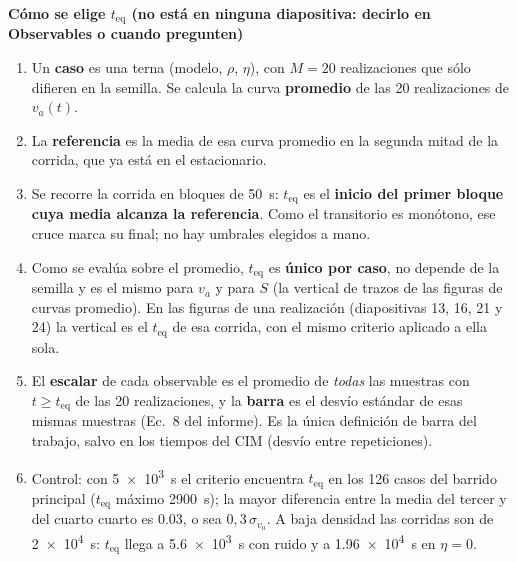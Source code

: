 \documentclass[10pt,a4paper]{article}
\newcommand{\va}{\ensuremath{v_a}}
\newcommand{\teq}{\ensuremath{t_{\mathrm{eq}}}}
\begin{document}
\vspace{0.5em}
\begin{tcolorbox}[colback=grisclaro,colframe=acento!50,boxrule=0.5pt,
                  arc=2pt,left=6pt,right=6pt,top=4pt,bottom=4pt]
{\small\bfseries\color{acento} Cómo se elige \teq{} (no está en ninguna
diapositiva: decirlo en Observables o cuando pregunten)}\par\vspace{0.3em}
{\small
\begin{enumerate}
    \setlength{\itemsep}{1pt}
    \item Un \textbf{caso} es una terna (modelo, $\rho$, $\eta$), con $M = 20$
          realizaciones que sólo difieren en la semilla. Se calcula la curva
          \textbf{promedio} de las 20 realizaciones de $\va(t)$.
    \item La \textbf{referencia} es la media de esa curva promedio en la
          segunda mitad de la corrida, que ya está en el estacionario.
    \item Se recorre la corrida en bloques de \SI{50}{s}: \teq{} es el
          \textbf{inicio del primer bloque cuya media alcanza la referencia}.
          Como el transitorio es monótono, ese cruce marca su final; no hay
          umbrales elegidos a mano.
    \item Como se evalúa sobre el promedio, \teq{} es \textbf{único por caso},
          no depende de la semilla y es el mismo para \va{} y para $S$ (la
          vertical de trazos de las figuras de curvas promedio). En las figuras
          de una realización (diapositivas 13, 16, 21 y 24) la vertical es el \teq{}
          de esa corrida, con el mismo criterio aplicado a ella sola.
    \item El \textbf{escalar} de cada observable es el promedio de
          \emph{todas} las muestras con $t \ge \teq$ de las 20 realizaciones,
          y la \textbf{barra} es el desvío estándar de esas mismas muestras
          (Ec.~8 del informe). Es la única definición de barra del trabajo,
          salvo en los tiempos del CIM (desvío entre repeticiones).
    \item Control: con \SI{5e3}{s} el criterio encuentra \teq{} en los 126
          casos del barrido principal (\teq{} máximo \SI{2900}{s}); la mayor
          diferencia entre la media del tercer y del cuarto cuarto es
          \num{0.03}, o sea $0{,}3\,\sigma_{\va}$. A baja densidad las
          corridas son de \SI{2e4}{s}: \teq{} llega a \SI{5.6e3}{s} con ruido
          y a \SI{1.96e4}{s} en $\eta = 0$.
\end{enumerate}
}
\end{tcolorbox}
\end{document}
